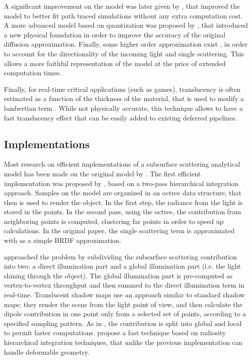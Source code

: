 A significant improvement on the model was later given by \cite{deondeon}, that improved the model to better fit path traced simulations without any extra computation cost. A more advanced model based on quantization was proposed by \cite{D'Eon:2011:QMR:1964921.1964951}, that introduced a new physical foundation in order to improve the accuracy of the original diffusion approximation. Finally, some higher order approximation exist \citep{IMM2013-06646}, in order to account for the directionality of the incoming light and single scattering. This allows a more faithful representation of the model at the price of extended computation times.

Finally, for real-time critical applications (such as games), translucency is often estimated as a function of the thickness of the material, that is used to modify a lambertian term \citep{Tomaszewska2012}. While not physically accurate, this technique allows to have a fast translucency effect that can be easily added to existing deferred pipelines.

\subsection{Implementations}

Most research on efficient implementations of a subsurface scattering analytical model has been made on the original model by \cite{Jensen:2001:PMS:383259.383319}. The first efficient implementation was proposed by \cite{Jensen:2002:RHR:566654.566619}, based on a two-pass hierarchical integration approach. Samples on the model are organized in an octree data structure, that then is used to render the object. In the first step, the radiance from the light is stored in the points. In the second pass, using the octree, the contribution from neighboring points is computed, clustering far points in order to speed up calculations. In the original paper, the single scattering term is approximated with as a simple BRDF approximation.

\cite{Lensch:2002:IRT:826030.826632} approached the problem by subdividing the subsurface scattering contribution into two: a direct illumination part and a global illumination part (i.e. the light shining through the object). The global illumination part is pre-computed as vertex-to-vertex throughput and then summed to the direct illumination term in real-time. Translucent shadow maps \citep{Dachsbacher:2003:TSM:882404.882433} use an approach similar to standard shadow maps: they render the scene from the light point of view, and then calculate the dipole contribution in one point only from a selected set of points, according to a specified sampling pattern. As in \cite{Lensch:2002:IRT:826030.826632}, the contribution is split into global and local to permit faster computations. \cite{Mertens:2003:IRT:882404.882423} propose a fast technique based on radiosity hierarchical integration techniques, that unlike the previous implementation can handle deformable geometry.

